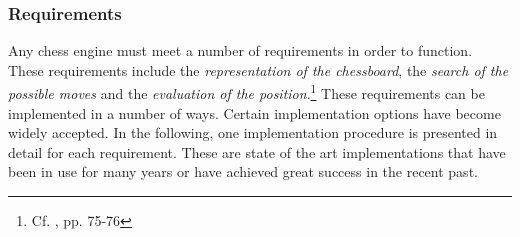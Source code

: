 \subsubsection{Requirements}

Any chess engine must meet a number of requirements in order to function. These requirements include the \textit{representation of the chessboard}, the \textit{search of the possible moves} and the \textit{evaluation of the position}.\footnote{Cf. \cite{nnfc-2022}, pp. 75-76} These requirements can be implemented in a number of ways. Certain implementation options have become widely accepted. In the following, one implementation procedure is presented in detail for each requirement. These are state of the art implementations that have been in use for many years or have achieved great success in the recent past.